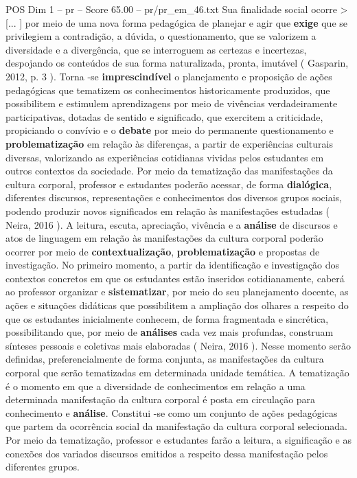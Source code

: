 \begin{textsample}{POS Dim 1 – pr – Score 65.00 – pr/pr\_em\_46.txt}
Sua finalidade social ocorre > [... ] por meio de uma nova forma pedagógica de planejar e agir que \textbf{exige} que se privilegiem a contradição, a dúvida, o questionamento, que se valorizem a diversidade e a divergência, que se interroguem as certezas e incertezas, despojando os conteúdos de sua forma naturalizada, pronta, imutável ( Gasparin, 2012, p. 3 ).
Torna -se \textbf{imprescindível} o planejamento e proposição de ações pedagógicas que tematizem os conhecimentos historicamente produzidos, que possibilitem e estimulem aprendizagens por meio de vivências verdadeiramente participativas, dotadas de sentido e significado, que exercitem a criticidade, propiciando o convívio e o \textbf{debate} por meio do permanente questionamento e \textbf{problematização} em relação às diferenças, a partir de experiências culturais diversas, valorizando as experiências cotidianas vividas pelos estudantes em outros contextos da sociedade.
Por meio da tematização das manifestações da cultura corporal, professor e estudantes poderão acessar, de forma \textbf{dialógica}, diferentes discursos, representações e conhecimentos dos diversos grupos sociais, podendo produzir novos significados em relação às manifestações estudadas ( Neira, 2016 ).
A leitura, escuta, apreciação, vivência e a \textbf{análise} de discursos e atos de linguagem em relação às manifestações da cultura corporal poderão ocorrer por meio de \textbf{contextualização}, \textbf{problematização} e propostas de investigação.
No primeiro momento, a partir da identificação e investigação dos contextos concretos em que os estudantes estão inseridos cotidianamente, caberá ao professor organizar e \textbf{sistematizar}, por meio do seu planejamento docente, as ações e situações didáticas que possibilitem a ampliação dos olhares a respeito do que os estudantes inicialmente conhecem, de forma fragmentada e sincrética, possibilitando que, por meio de \textbf{análises} cada vez mais profundas, construam sínteses pessoais e coletivas mais elaboradas ( Neira, 2016 ).
Nesse momento serão definidas, preferencialmente de forma conjunta, as manifestações da cultura corporal que serão tematizadas em determinada unidade temática.
A tematização é o momento em que a diversidade de conhecimentos em relação a uma determinada manifestação da cultura corporal é posta em circulação para conhecimento e \textbf{análise}.
Constitui -se como um conjunto de ações pedagógicas que partem da ocorrência social da manifestação da cultura corporal selecionada.
Por meio da tematização, professor e estudantes farão a leitura, a significação e as conexões dos variados discursos emitidos a respeito dessa manifestação pelos diferentes grupos.

\end{textsample}
